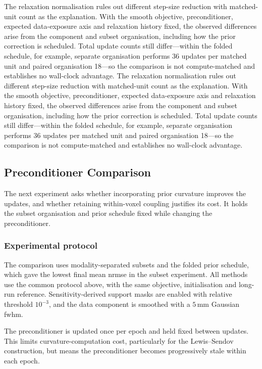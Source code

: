 The relaxation normalisation rules out different step-size reduction with matched-unit count as the explanation. With the smooth objective, preconditioner, expected data-exposure axis and relaxation history fixed, the observed differences arise from the component and subset organisation, including how the prior correction is scheduled. Total update counts still differ---within the folded schedule, for example, separate organisation performs 36 updates per matched unit and paired organisation 18---so the comparison is not compute-matched and establishes no wall-clock advantage.
The relaxation normalisation rules out different step-size reduction with matched-unit count as the explanation. With the smooth objective, preconditioner, expected data-exposure axis and relaxation history fixed, the observed differences arise from the component and subset organisation, including how the prior correction is scheduled. Total update counts still differ---within the folded schedule, for example, separate organisation performs 36 updates per matched unit and paired organisation 18---so the comparison is not compute-matched and establishes no wall-clock advantage.

\subsection{Preconditioner Comparison}

The next experiment asks whether incorporating prior curvature improves the updates, and whether retaining within-voxel coupling justifies its cost. It holds the subset organisation and prior schedule fixed while changing the preconditioner.

\subsubsection{Experimental protocol}
\label{subsec:preconditioner_experiment_methods}

The comparison uses modality-separated subsets and the folded prior schedule, which gave the lowest final mean \gls{nrmse} in the subset experiment. All methods use the common protocol above, with the same objective, initialisation and long-run reference. Sensitivity-derived support masks are enabled with relative threshold $10^{-3}$, and the data component is smoothed with a $5\,\mathrm{mm}$ Gaussian \gls{fwhm}.

The preconditioner is updated once per epoch and held fixed between updates. This limits curvature-computation cost, particularly for the Lewis--Sendov construction, but means the preconditioner becomes progressively stale within each epoch.

